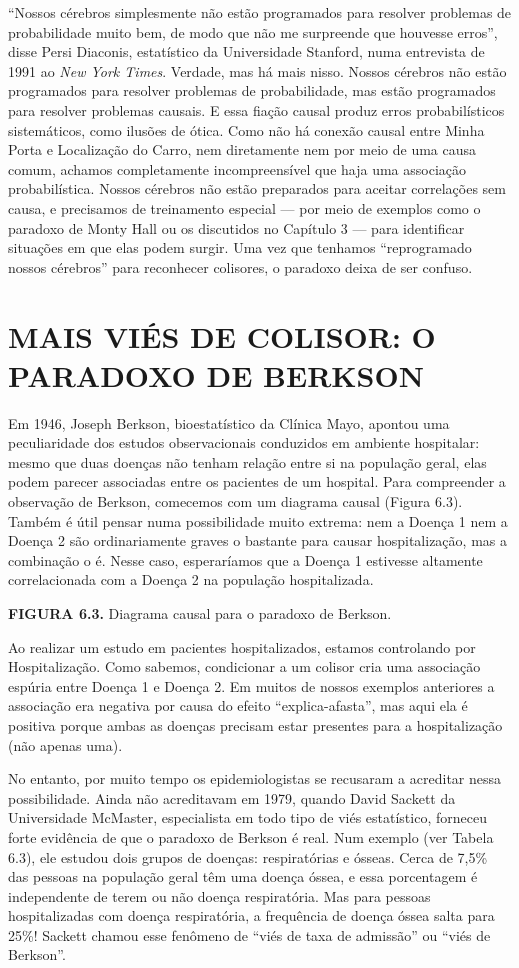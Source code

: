 \documentclass[11pt,a5paper,twoside]{book}
\begin{document}
“Nossos cérebros simplesmente não estão programados para resolver problemas de probabilidade muito bem, de modo que não me surpreende que houvesse erros”, disse Persi Diaconis, estatístico da Universidade Stanford, numa entrevista de 1991 ao \textit{New York Times}. Verdade, mas há mais nisso. Nossos cérebros não estão programados para resolver problemas de probabilidade, mas estão programados para resolver problemas causais. E essa fiação causal produz erros probabilísticos sistemáticos, como ilusões de ótica. Como não há conexão causal entre Minha Porta e Localização do Carro, nem diretamente nem por meio de uma causa comum, achamos completamente incompreensível que haja uma associação probabilística. Nossos cérebros não estão preparados para aceitar correlações sem causa, e precisamos de treinamento especial — por meio de exemplos como o paradoxo de Monty Hall ou os discutidos no Capítulo 3 — para identificar situações em que elas podem surgir. Uma vez que tenhamos “reprogramado nossos cérebros” para reconhecer colisores, o paradoxo deixa de ser confuso.

\section{MAIS VIÉS DE COLISOR: O PARADOXO DE BERKSON}
Em 1946, Joseph Berkson, bioestatístico da Clínica Mayo, apontou uma peculiaridade dos estudos observacionais conduzidos em ambiente hospitalar: mesmo que duas doenças não tenham relação entre si na população geral, elas podem parecer associadas entre os pacientes de um hospital. Para compreender a observação de Berkson, comecemos com um diagrama causal (Figura 6.3). Também é útil pensar numa possibilidade muito extrema: nem a Doença 1 nem a Doença 2 são ordinariamente graves o bastante para causar hospitalização, mas a combinação o é. Nesse caso, esperaríamos que a Doença 1 estivesse altamente correlacionada com a Doença 2 na população hospitalizada.

\textbf{FIGURA 6.3.} Diagrama causal para o paradoxo de Berkson.

Ao realizar um estudo em pacientes hospitalizados, estamos controlando por Hospitalização. Como sabemos, condicionar a um colisor cria uma associação espúria entre Doença 1 e Doença 2. Em muitos de nossos exemplos anteriores a associação era negativa por causa do efeito “explica-afasta”, mas aqui ela é positiva porque ambas as doenças precisam estar presentes para a hospitalização (não apenas uma).

No entanto, por muito tempo os epidemiologistas se recusaram a acreditar nessa possibilidade. Ainda não acreditavam em 1979, quando David Sackett da Universidade McMaster, especialista em todo tipo de viés estatístico, forneceu forte evidência de que o paradoxo de Berkson é real. Num exemplo (ver Tabela 6.3), ele estudou dois grupos de doenças: respiratórias e ósseas. Cerca de 7,5\% das pessoas na população geral têm uma doença óssea, e essa porcentagem é independente de terem ou não doença respiratória. Mas para pessoas hospitalizadas com doença respiratória, a frequência de doença óssea salta para 25\%! Sackett chamou esse fenômeno de “viés de taxa de admissão” ou “viés de Berkson”.
\end{document}

